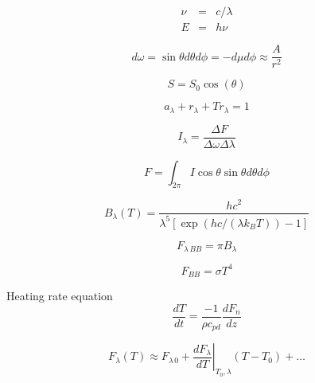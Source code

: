 \documentclass[12pt]{article}
\begin{document}
\begin{multicols}{2}


\begin{eqnarray}
  \label{eq:nu}
  \nu &=& c / \lambda\\
   E &=& h \nu
\end{eqnarray}

\begin{equation}
  \label{eq:omega}
  d \omega = \sin \theta d\theta d\phi = -d\mu d\phi \approx \frac{ A}{r^2} 
\end{equation}

\begin{equation}
  \label{eq:cos}
  S = S_0 \cos(\theta)
\end{equation}

\begin{equation}
  \label{eq:conservation}
  a_\lambda + r_\lambda + Tr_\lambda = 1
\end{equation}

\begin{equation}
  \label{eq:intensity}
  I_\lambda = \frac{\Delta F}{\Delta \omega \Delta \lambda}
\end{equation}

\begin{equation}
  \label{eq:flux_int}
  F = \int_{2 \pi} I \cos \theta \sin \theta d \theta d \phi
\end{equation}

\begin{equation}
  \label{planck}
B_\lambda(T)  = \frac{h c^2}{\lambda^5 \left [ \exp (h c/(\lambda k_B T )) -1 \right ] }
\end{equation}


\begin{equation}
  \label{eq:pi}
  F_{\lambda\,BB} = \pi B_\lambda
\end{equation}


\begin{equation}
  \label{eq:stefan}
  F_{BB}=\sigma T^4
\end{equation}

\noindent
Heating rate equation
\begin{equation}
  \label{eq:fluxdiv}
  \frac{dT}{dt} = \frac{-1}{\rho c_{pd}} \frac{dF_n}{dz}
\end{equation}


\begin{equation}
  \label{eq:taylor}
  F_\lambda(T) \approx F_{\lambda\, 0} + \left .\frac{dF_\lambda}{dT}  \right |_{T_0,\lambda} \!\!\! (T - T_0) + \ldots
\end{equation}


\end{multicols}
\end{document}
